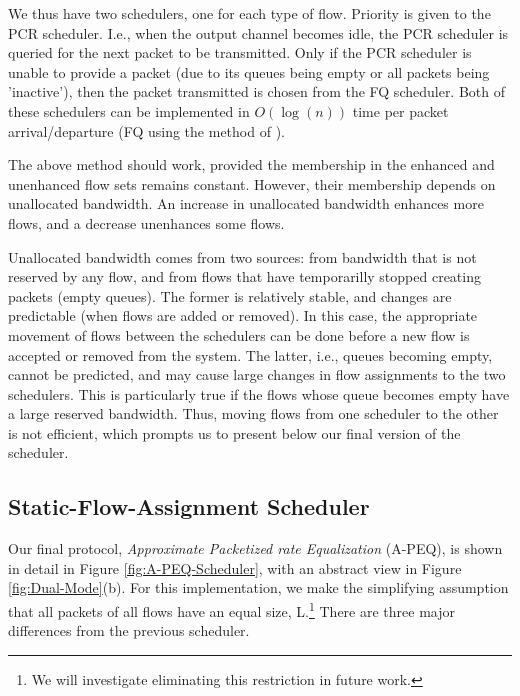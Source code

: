 \documentclass[conference]{IEEEtran}
\begin{document}
We thus have two schedulers, one for each type of flow. Priority is given to 
the PCR scheduler. I.e., when the output channel becomes idle, the PCR 
scheduler is queried for the next packet to be transmitted. Only if the PCR 
scheduler is unable to provide a packet (due to its queues being empty or all 
packets being 'inactive'), then the packet transmitted is chosen from the FQ 
scheduler. Both of these schedulers can be implemented in $O(\log(n))$ time per 
packet arrival/departure (FQ using the method of \cite{WFQlogN}).

The above method should work, provided the membership in the enhanced and 
unenhanced flow sets remains constant. However, their membership depends on 
unallocated bandwidth. An increase in unallocated bandwidth enhances more 
flows, and a decrease unenhances some flows. 

Unallocated bandwidth comes from two sources: from bandwidth that is not 
reserved by any flow, and from flows that have temporarilly stopped creating 
packets (empty queues). The former is relatively stable, and changes are 
predictable (when flows are added or removed). In this case, the appropriate 
movement of flows between the schedulers can be done before a new flow is 
accepted or removed from the system. The latter, i.e., queues becoming empty, 
cannot be predicted, and may cause large changes in flow assignments to the two 
schedulers. This is particularly true if the flows whose queue becomes empty 
have a large reserved bandwidth. Thus, moving flows from one scheduler to the 
other is not efficient, which prompts us to present below our final version of 
the scheduler.


\subsection{Static-Flow-Assignment Scheduler}
\label{subsec:Static-Flow-Scheduler}



Our final protocol, {\em Approximate Packetized rate Equalization} (A-PEQ), is 
shown in detail in Figure \ref{fig:A-PEQ-Scheduler}, with an abstract view in 
Figure \ref{fig:Dual-Mode}(b). For this implementation, we make the simplifying 
assumption that all packets of all flows have an equal size, L.\footnote{We 
will investigate eliminating this restriction in future work.} There are three 
major differences from the previous scheduler.
\end{document}
